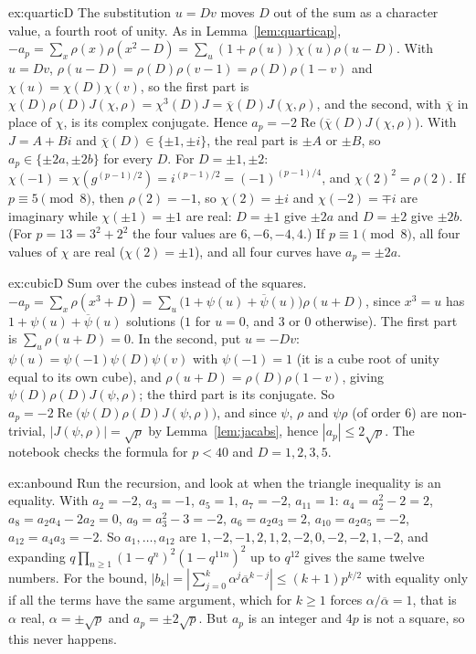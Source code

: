 \begin{solution}{ex:quarticD}
\idea The substitution $u=Dv$ moves $D$ out of the sum as a character value, a fourth root of unity.
\writeup As in Lemma~\ref{lem:quarticap}, $-a_p=\sum_x\rho(x)\rho(x^2-D)=\sum_u(1+\rho(u))\chi(u)\rho(u-D)$. With $u=Dv$, $\rho(u-D)=\rho(D)\rho(v-1)=\rho(D)\rho(1-v)$
and $\chi(u)=\chi(D)\chi(v)$, so the first part is $\chi(D)\rho(D)J(\chi,\rho)=\chi^3(D)J=\overline\chi(D)J(\chi,\rho)$, and the second, with $\overline\chi$ in place of
$\chi$, is its complex conjugate. Hence $a_p=-2\operatorname{Re}\bigl(\overline\chi(D)J(\chi,\rho)\bigr)$. With $J=A+Bi$ and $\overline\chi(D)\in\{\pm1,\pm i\}$, the real
part is $\pm A$ or $\pm B$, so $a_p\in\{\pm2a,\pm2b\}$ for every $D$. For $D=\pm1,\pm2$: $\chi(-1)=\chi(g^{(p-1)/2})=i^{(p-1)/2}=(-1)^{(p-1)/4}$, and $\chi(2)^2=\rho(2)$.
If $p\equiv5\pmod8$, then $\rho(2)=-1$, so $\chi(2)=\pm i$ and $\chi(-2)=\mp i$ are imaginary while $\chi(\pm1)=\pm1$ are real: $D=\pm1$ give $\pm2a$ and $D=\pm2$
give $\pm2b$. (For $p=13=3^2+2^2$ the four values are $6,-6,-4,4$.) If $p\equiv1\pmod8$, all four values of $\chi$ are real ($\chi(2)=\pm1$), and all four
curves have $a_p=\pm2a$.
\end{solution}

\begin{solution}{ex:cubicD}
\idea Sum over the cubes instead of the squares.
\writeup $-a_p=\sum_x\rho(x^3+D)=\sum_u\bigl(1+\psi(u)+\overline\psi(u)\bigr)\rho(u+D)$, since $x^3=u$ has $1+\psi(u)+\overline\psi(u)$ solutions ($1$ for $u=0$, and $3$
or $0$ otherwise). The first part is $\sum_u\rho(u+D)=0$. In the second, put $u=-Dv$: $\psi(u)=\psi(-1)\psi(D)\psi(v)$ with $\psi(-1)=1$ (it is a cube root of unity
equal to its own cube), and $\rho(u+D)=\rho(D)\rho(1-v)$, giving $\psi(D)\rho(D)J(\psi,\rho)$; the third part is its conjugate. So
$a_p=-2\operatorname{Re}\bigl(\psi(D)\rho(D)J(\psi,\rho)\bigr)$, and since $\psi$, $\rho$ and $\psi\rho$ (of order $6$) are non-trivial, $|J(\psi,\rho)|=\sqrt p$
by Lemma~\ref{lem:jacabs}, hence $|a_p|\le2\sqrt p$. The notebook checks the formula for $p<40$ and $D=1,2,3,5$.
\end{solution}

\begin{solution}{ex:anbound}
\idea Run the recursion, and look at when the triangle inequality is an equality.
\writeup With $a_2=-2$, $a_3=-1$, $a_5=1$, $a_7=-2$, $a_{11}=1$: $a_4=a_2^2-2=2$, $a_8=a_2a_4-2a_2=0$, $a_9=a_3^2-3=-2$, $a_6=a_2a_3=2$, $a_{10}=a_2a_5=-2$,
$a_{12}=a_4a_3=-2$. So $a_1,\dots,a_{12}$ are $1,-2,-1,2,1,2,-2,0,-2,-2,1,-2$, and expanding $q\prod_{n\ge1}(1-q^n)^2(1-q^{11n})^2$ up to $q^{12}$
gives the same twelve numbers. For the bound, $|b_k|=|\sum_{j=0}^k\alpha^j\overline\alpha^{k-j}|\le(k+1)p^{k/2}$ with equality only if all the terms have the same
argument, which for $k\ge1$ forces $\alpha/\overline\alpha=1$, that is $\alpha$ real, $\alpha=\pm\sqrt p$ and $a_p=\pm2\sqrt p$. But $a_p$ is an integer and $4p$ is
not a square, so this never happens.
\end{solution}


